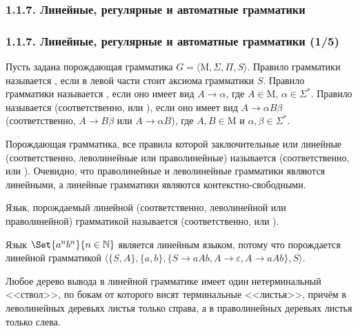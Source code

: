 \subsubsection{1.1.7. Линейные, регулярные и автоматные грамматики}\label{1.1.7.}
\begin{frame}
\frametitle{1.1.7. Линейные, регулярные и автоматные грамматики (1/5)}

Пусть задана порождающая грамматика $G=\langle \mathrm{M}, \Sigma, \Pi, S\rangle$.
Правило грамматики называется
, если 
в левой части стоит аксиома грамматики $S$.
Правило грамматики называется
, если оно имеет
вид $A\rightarrow\alpha$, где $A\in \mathrm{M}$, $\alpha\in \Sigma^*$. 
Правило
называется 
(соответственно,
 или
 ),
если оно имеет вид $A\rightarrow \alpha B\beta$ (соответственно, $A\rightarrow B\beta$ или
$A\rightarrow \alpha B$), где $A, B \in \mathrm{M}$ и 
$\alpha, \beta\in \Sigma^*$.

\smallskip
Порождающая грамматика, все правила которой заключительные или
линейные (соответственно, леволинейные или праволинейные) называется
 (соответственно, 
 или
). 
Очевидно,
что праволинейные и леволинейные грамматики
являются линейными, а линейные грамматики
являются контекстно-свободными.

\smallskip
Язык, порождаемый линейной (соответственно,
леволинейной или праволинейной) грамматикой
называется    
(соответственно, 
 или
). 
\begin{example}
Язык $\Set{a^n b^n}{n\in \Bbb{N}}$ 
является линейным языком, потому что порождается 
линейной грамматикой
$\langle \{S, A\}, \{a,b\},
\{S\rightarrow aAb, A\rightarrow 
\varepsilon, A\rightarrow aAb\},S\rangle$.
\end{example}

\begin{remark}
Любое дерево вывода в линейной грамматике
имеет один нетерминальный <<ствол>>,
по бокам от которого висят терминальные 
<<листья>>, причём в леволинейных деревьях листья только справа, а в праволинейных деревьях листья только слева.
\end{remark}

\end{frame}


